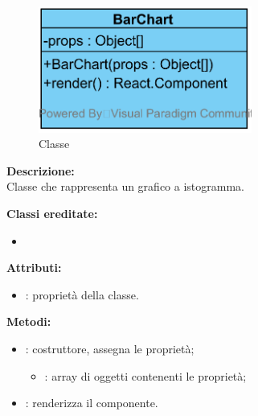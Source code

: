 \paragraph[::BarChart]{\class}\mbox{}\\ \label{\class}
\begin{figure}[H]
	\centering
	\includegraphics[width=7cm]{./diagrammi/framework/view/gui/barchart.png}
	\caption{Classe \class}
\end{figure}
\textbf{Descrizione:}\\
Classe che rappresenta un grafico a istogramma.


\textbf{Classi ereditate:}
\begin{itemize}
	\item {}
\end{itemize}


\textbf{Attributi:}
\begin{itemize}
	\item {}: proprietà della classe.
\end{itemize}

\textbf{Metodi:}
\begin{itemize}
	\item {}: costruttore, assegna le proprietà;
	\begin{itemize}
		\item {}: array di oggetti contenenti le proprietà;
	\end{itemize}
	\item {}: renderizza il componente.
\end{itemize}

